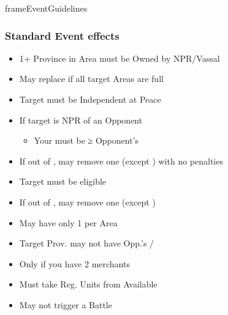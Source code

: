 \documentclass[10pt]{article}
\newlength{\fhEventGuidelines} \setlength\fhEventGuidelines{34.5\baselineskip}
\begin{document}
\begin{dynamiccontents*}{frameEventGuidelines}
\begin{eubox}{\fhEventGuidelines}
\begin{multicols*}{2}
		\subsubsection*{Standard Event effects }
		\begin{itemize}
			\item 1+ Province in Area must be Owned by NPR/Vassal
			\item May replace \influence if all target Areas are full
		\end{itemize}
		\begin{itemize}
			\item Target must be Independent  at Peace
			\item If target is NPR \ally of an Opponent
			\begin{itemize}
				\item Your \influence must be ≥ Opponent's \influence
			\end{itemize}
			\item If out of \alliances, may remove one (except \activeally) with no penalties
		\end{itemize}
		\begin{itemize}
			\item Target must be eligible
			\item If out of \marriages, may remove one (except \disputedsuccession)
		\end{itemize}
		\begin{itemize}
			\item May have only 1 per Area
		\end{itemize}
		\begin{itemize}
			\item Target Prov. may not have Opp.'s \town/\vassal
		\end{itemize}
		\begin{itemize}
			\item Only if you have 2 merchants
		\end{itemize}
		\begin{itemize}
			\item Must take Reg. Units from Available \manpower
			\item May not trigger a Battle
		\end{itemize}

\end{multicols*}
\end{eubox}
\end{dynamiccontents*}
\end{document}
